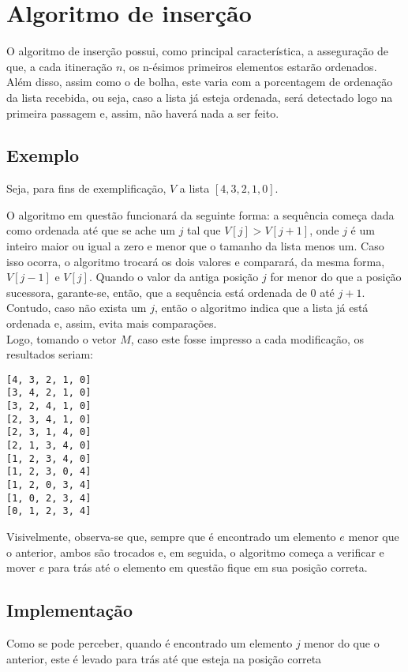 \section{Algoritmo de inserção}
O algoritmo de inserção possui, como principal característica, a asseguração de que, a cada itineração $n$, os n-ésimos primeiros elementos estarão ordenados. Além disso, assim como o de bolha, este varia com a porcentagem de ordenação da lista recebida, ou seja, caso a lista já esteja ordenada, será detectado logo na primeira passagem e, assim, não haverá nada a ser feito. 


\subsection{Exemplo}
Seja, para fins de exemplificação, $V$ a lista $[4,3,2,1,0]$.  

O algoritmo em questão funcionará da seguinte forma: a sequência começa dada como ordenada até que se ache um $j$ tal que $V[j]>V[j+1]$, onde $j$ é um inteiro maior ou igual a zero e menor que o tamanho da lista menos um. 
Caso isso ocorra, o algoritmo trocará os dois valores e comparará, da mesma forma, $V[j-1]$ e $V[j]$. Quando o valor da antiga posição $j$ for menor do que a posição sucessora, garante-se, então, que a sequência está ordenada de 0 até $j+1$. Contudo, caso não exista um $j$, então o algoritmo indica que a lista já está ordenada e, assim, evita mais comparações.
\\

Logo, tomando o vetor $M$, caso este fosse impresso a cada modificação, os resultados seriam:
\begin{lstlisting}
[4, 3, 2, 1, 0]
[3, 4, 2, 1, 0]
[3, 2, 4, 1, 0]
[2, 3, 4, 1, 0]
[2, 3, 1, 4, 0]
[2, 1, 3, 4, 0]
[1, 2, 3, 4, 0]
[1, 2, 3, 0, 4]
[1, 2, 0, 3, 4]
[1, 0, 2, 3, 4]
[0, 1, 2, 3, 4]
\end{lstlisting}

Visivelmente, observa-se que, sempre que é encontrado um elemento $e$ menor que o anterior, ambos são trocados e, em seguida, o algoritmo começa a verificar e mover $e$ para trás até o elemento em questão fique em sua posição correta.
\newpage

\subsection{Implementação}
Como se pode perceber, quando é encontrado um elemento $j$ menor do que o anterior, este é levado para trás até que esteja na posição correta

